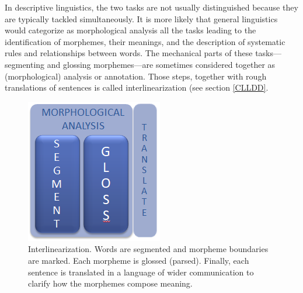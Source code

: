 \documentclass[12pt]{article}
\begin{document}
In descriptive linguistics, the two tasks are not usually distinguished because they are typically tackled simultaneously. It is more likely that general linguistics would categorize as morphological analysis all the tasks leading to the identification of morphemes, their meanings, and the description of systematic rules and relationships between words. The mechanical parts of these tasks---segmenting and glossing morphemes---are sometimes considered together as (morphological) analysis or annotation. Those steps, together with rough translations of sentences is called interlinearization (see section \ref{CLLDD}.   

\begin{figure}[ht]
\label{fig:IGT}
\begin{center}
\includegraphics[width=0.7\columnwidth]{IGT.PNG}
\caption{Interlinearization. Words are segmented and morpheme boundaries are marked. Each morpheme is glossed (parsed). Finally, each sentence is translated in a language of wider communication to clarify how the morphemes compose meaning.}
\end{center}
\end{figure}
 
\end{document}
